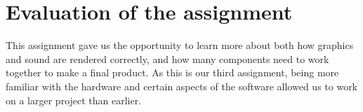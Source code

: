 \section{Evaluation of the assignment}
This assignment gave us the opportunity to learn more about both how graphics and sound are rendered correctly, and how many components need to work together to make a final product. As this is our third assignment, being more familiar with the hardware and certain aspects of the software allowed us to work on a larger project than earlier.